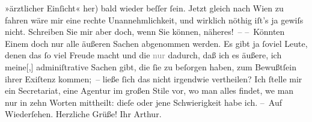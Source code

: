 \begin{ledgroupsized}[t]{13cm}
                    »ärztlicher Einſicht« her) bald {\pb}wieder beſſer
                    ſein. Jetzt gleich nach Wien zu fahren wäre
                    mir eine rechte Unannehmlichkeit, und wirklich nöthig iſt’s ja gewiſs nicht.
                    Schreiben Sie mir aber doch, wenn Sie können, näheres! –\pend
           \pstart
           – Könnten Einem doch nur alle äußeren Sachen abgenommen werden. Es gibt ja ſoviel
                    Leute, denen das ſo viel Freude macht und die \textcolor{gray}{nur} dadurch,
                    daß ich es äußere, ich {\pb}meine{[},{]} adminiſtrative Sachen gibt, die ſie zu
                    beſorgen haben, zum Bewußtſein ihrer Exiſtenz kommen; – ließe ſich das
                    nicht irgendwie vertheilen? Ich ſtelle mir ein Secretariat, eine Agentur im
                    großen Stile vor, wo man alles findet, we{\geminationn} man nur
                    in zehn Worten mittheilt: dieſe oder jene Schwierigkeit habe ich.\pend
           \pstart – Auf Wiederſehen. Herzliche Grüße! Ihr \spacefill\mbox{Arthur.}\pend{}          \endnumbering{}\end{ledgroupsized}  \newcommand{\dateiname}{L00698}\newcommand{\titel}{Arthur Schnitzler an Hugo von Hofmannsthal, 9. 7. 1897}\newcommand{\editorInnen}{Martin Anton Müller und Gerd-Hermann Susen}
      